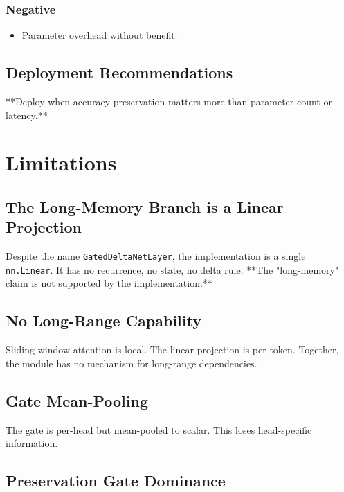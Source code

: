 \subsubsection{Negative}

\begin{itemize}
\item Parameter overhead without benefit.

\end{itemize}
\subsection{Deployment Recommendations}

**Deploy when accuracy preservation matters more than parameter count or 
latency.**




\section{Limitations}

\subsection{The Long-Memory Branch is a Linear Projection}

Despite the name \texttt{GatedDeltaNetLayer}, the implementation is a single 
\texttt{nn.Linear}. It has no recurrence, no state, no delta rule. **The 
"long-memory" claim is not supported by the implementation.**

\subsection{No Long-Range Capability}

Sliding-window attention is local. The linear projection is per-token. 
Together, the module has no mechanism for long-range dependencies.

\subsection{Gate Mean-Pooling}

The gate is per-head but mean-pooled to scalar. This loses head-specific 
information.

\subsection{Preservation Gate Dominance}

